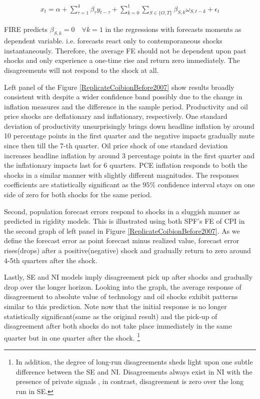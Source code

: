 \documentclass[12pt]{article}
\begin{document}
	\begin{eqnarray}\label{IRRegression}
		x_{t}  = \alpha + \sum^4_{\tau=1} \beta_{\tau} y_{t-\tau} +  \sum^1_{k=0} \sum_{S \in \{O,T\}}\beta_{S,k}\omega_{S,t-k} + \epsilon_t 
	\end{eqnarray}
	
	FIRE predicts $\beta_{S,k}=0\quad \forall k=1$ in the regressions with forecasts moments as dependent variable. i.e. forecasts react only to contemporaneous shocks instantaneously. Therefore, the average FE should not be dependent upon past shocks and  only experience a one-time rise and return zero immediately. The disagreements will not respond to the shock at all. 
	
	Left panel of the Figure \ref{ReplicateCoibionBefore2007} show results broadly consistent with \citet{coibion2012can} despite a wider confidence band possibly due to the change in inflation measures and the difference in the sample period. Productivity and oil price shocks are deflationary and inflationary, respectively. One standard deviation of productivity unsurprisingly brings down headline inflation by around 10 percentage points  in the first quarter and the negative impacts gradually mute since then till the 7-th quarter. Oil price shock of one standard deviation increases headline inflation by around 3 percentage points in the first quarter and the inflationary impacts last for 6 quarters. PCE inflation responds to both the shocks in a similar manner with slightly different magnitudes. The responses coefficients are statistically significant as the $95\%$ confidence interval stays on one side of zero for both shocks for the same period. 
	
	Second, population forecast errors respond to shocks in a sluggish manner as predicted in rigidity models. This is illustrated using both SPF's FE of CPI in the second graph of  left panel in Figure \ref{ReplicateCoibionBefore2007}. As we define the forecast error as point forecast minus realized value, forecast error rises(drops) after a positive(negative) shock and gradually return to zero around 4-5th quarters after the shock. 
	
	Lastly, SE and NI models imply disagreement pick up after shocks and gradually drop over the longer horizon.  Looking into the graph, the average response of disagreement to absolute value of  technology and oil shocks exhibit patterns similar to this prediction. Note now that the initial response is no longer statistically significant(same as the original result) and the pick-up of disagreement after both shocks do not take place immediately in the same quarter but in one quarter after the shock. \footnote{In addition, the degree of long-run disagreements sheds light upon one subtle difference between the SE and NI. Disagreements always exist in NI with the presence of private signals , in contrast, disagreement is zero over the long run in SE. }
	
\end{document}
